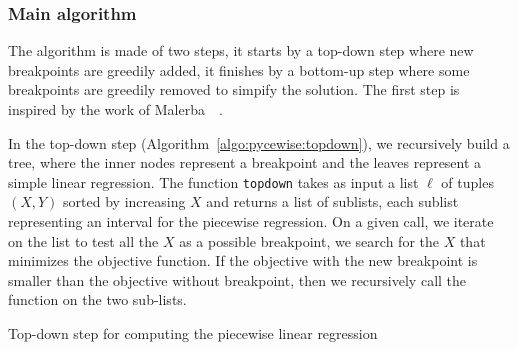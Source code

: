             \subsubsection{Main algorithm}%

                The algorithm is made of two steps, it starts by a top-down step where new breakpoints are
                greedily added, it finishes by a bottom-up step where some breakpoints are greedily removed to simpify
                the solution. The first step is inspired by the work of Malerba~\etal~\cite{Malerba_2004}.

                In the top-down step (Algorithm~\ref{algo:pycewise:topdown}), we recursively build a tree, where the inner
                nodes represent a breakpoint and the leaves represent a simple linear regression. The function
                \texttt{topdown} takes as input a list \(\ell\) of tuples \((X,Y)\) sorted by increasing \(X\) and
                returns a list of sublists, each sublist representing an interval for the piecewise regression. On a
                given call, we iterate on the list to test all the \(X\) as a possible breakpoint, we search for the
                \(X\) that minimizes the objective function.  If the objective with the new breakpoint is smaller than
                the objective without breakpoint, then we recursively call the function on the two sub-lists.
                \begin{algorithm}
                    \DontPrintSemicolon
                    \caption{Top-down step for computing the piecewise linear regression}
                    \label{algo:pycewise:topdown}
                \end{algorithm}

